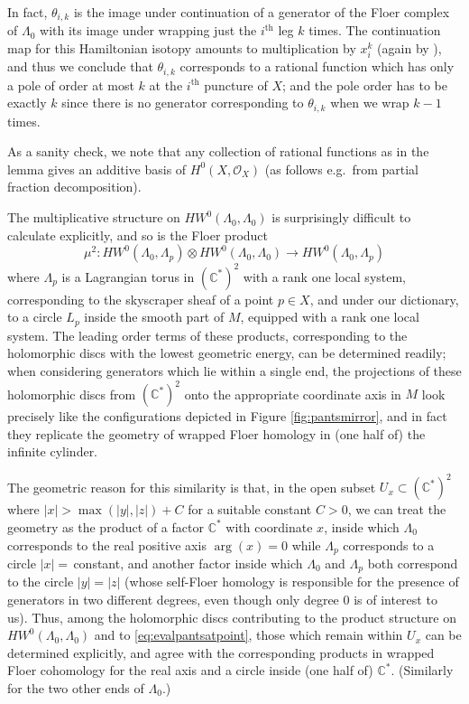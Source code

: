 \documentclass[11pt,leqno]{amsart}
\numberwithin{equation}{section}
\def\C{\mathbb{C}}
\def\O{{\mathcal O}}
\begin{document}
In fact, $\theta_{i,k}$ is the image under continuation of
a generator of the Floer complex of $\Lambda_0$ with its image under
wrapping just the $i^\text{th}$ leg $k$ times. The continuation map for this
Hamiltonian isotopy amounts to multiplication by $x_i^k$ (again by
\cite{Hanlon}), and thus we conclude that $\theta_{i,k}$ corresponds to a
rational function which has only a pole of order at most $k$ at the
$i^\text{th}$ 
puncture of $X$; and the pole order has to be exactly $k$ since there is
no generator corresponding to $\theta_{i,k}$ when we wrap $k-1$ times.
\endproof

As a sanity check, we note that 
any collection of rational functions as in the lemma gives an additive basis of
$H^0(X,\O_X)$ (as follows e.g.\ from partial fraction decomposition).


The multiplicative structure on $HW^0(\Lambda_0,\Lambda_0)$ is surprisingly
difficult to calculate explicitly, and so is the Floer product 
\begin{equation}\label{eq:evalpantsatpoint}
\mu^2:HW^0(\Lambda_0,\Lambda_p)\otimes HW^0(\Lambda_0,\Lambda_0)\to
HW^0(\Lambda_0,\Lambda_p)
\end{equation}
where $\Lambda_p$ is a Lagrangian torus in $(\C^*)^2$ with a rank one
local system, corresponding to the skyscraper sheaf of a point $p\in X$,
and under our dictionary, to a circle $L_p$ inside the smooth part of $M$,
equipped with a rank one local system. The leading order terms
of these products, corresponding to the holomorphic discs with the lowest
geometric energy, can be determined readily; when considering generators
which lie within a single end, the projections
of these holomorphic discs from $(\C^*)^2$ onto the appropriate coordinate
axis in $M$ look precisely like the configurations depicted in 
Figure \ref{fig:pantsmirror}, and in fact they replicate the geometry of
wrapped Floer homology in (one half of) the infinite cylinder.

The geometric reason for this similarity is that, in the open subset
$U_x\subset (\C^*)^2$ where $|x|>\max(|y|,|z|)+C$ for a suitable constant $C>0$, we
can treat the geometry as the product of a factor $\C^*$ with coordinate $x$,
inside which $\Lambda_0$ corresponds to the real positive axis $\arg(x)=0$
while $\Lambda_p$ corresponds to a circle $|x|=$\,constant, and another
factor inside which $\Lambda_0$ and $\Lambda_p$ both correspond to the
circle $|y|=|z|$ (whose self-Floer homology is responsible for the presence
of generators in two different degrees, even though only degree 0 is of
interest to us). Thus, among the holomorphic discs contributing to the product
structure on $HW^0(\Lambda_0,\Lambda_0)$ and to \eqref{eq:evalpantsatpoint},
those which remain within $U_x$ can be determined explicitly, and agree with
the corresponding products in wrapped Floer cohomology for the real axis and a 
circle inside (one half of) $\C^*$. (Similarly for the two other ends of
$\Lambda_0$.)
\end{document}
